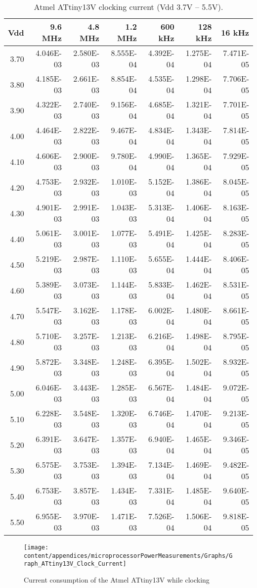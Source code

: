 \begin{sidewaystable}
\begin{centering}
\begin{tabular}{|r|r|r|r|r|r|r|}
\hline
Vdd  & 9.6 MHz  & 4.8 MHz  & 1.2 MHz  & 600 kHz  & 128 kHz  & 16 kHz\tabularnewline
\hline
3.70  & 4.046E-03  & 2.580E-03  & 8.555E-04  & 4.392E-04  & 1.275E-04  & 7.471E-05 \tabularnewline
3.80  & 4.185E-03  & 2.661E-03  & 8.854E-04  & 4.535E-04  & 1.298E-04  & 7.706E-05 \tabularnewline
3.90  & 4.322E-03  & 2.740E-03  & 9.156E-04  & 4.685E-04  & 1.321E-04  & 7.701E-05 \tabularnewline
4.00  & 4.464E-03  & 2.822E-03  & 9.467E-04  & 4.834E-04  & 1.343E-04  & 7.814E-05 \tabularnewline
4.10  & 4.606E-03  & 2.900E-03  & 9.780E-04  & 4.990E-04  & 1.365E-04  & 7.929E-05 \tabularnewline
4.20  & 4.753E-03  & 2.932E-03  & 1.010E-03  & 5.152E-04  & 1.386E-04  & 8.045E-05 \tabularnewline
4.30  & 4.901E-03  & 2.991E-03  & 1.043E-03  & 5.313E-04  & 1.406E-04  & 8.163E-05 \tabularnewline
4.40  & 5.061E-03  & 3.001E-03  & 1.077E-03  & 5.491E-04  & 1.425E-04  & 8.283E-05 \tabularnewline
4.50  & 5.219E-03  & 2.987E-03  & 1.110E-03  & 5.655E-04  & 1.444E-04  & 8.406E-05 \tabularnewline
4.60  & 5.389E-03  & 3.073E-03  & 1.144E-03  & 5.833E-04  & 1.462E-04  & 8.531E-05 \tabularnewline
4.70  & 5.547E-03  & 3.162E-03  & 1.178E-03  & 6.002E-04  & 1.480E-04  & 8.661E-05 \tabularnewline
4.80  & 5.710E-03  & 3.257E-03  & 1.213E-03  & 6.216E-04  & 1.498E-04  & 8.795E-05 \tabularnewline
4.90  & 5.872E-03  & 3.348E-03  & 1.248E-03  & 6.395E-04  & 1.502E-04  & 8.932E-05 \tabularnewline
5.00  & 6.046E-03  & 3.443E-03  & 1.285E-03  & 6.567E-04  & 1.484E-04  & 9.072E-05 \tabularnewline
5.10  & 6.228E-03  & 3.548E-03  & 1.320E-03  & 6.746E-04  & 1.470E-04  & 9.213E-05 \tabularnewline
5.20  & 6.391E-03  & 3.647E-03  & 1.357E-03  & 6.940E-04  & 1.465E-04  & 9.346E-05 \tabularnewline
5.30  & 6.575E-03  & 3.753E-03  & 1.394E-03  & 7.134E-04  & 1.469E-04  & 9.482E-05 \tabularnewline
5.40  & 6.753E-03  & 3.857E-03  & 1.434E-03  & 7.331E-04  & 1.485E-04  & 9.640E-05 \tabularnewline
5.50  & 6.955E-03  & 3.970E-03  & 1.471E-03  & 7.526E-04  & 1.506E-04  & 9.818E-05 \tabularnewline
\hline
\end{tabular}
\par\end{centering}

\protect\caption{Atmel ATtiny13V clocking current (Vdd 3.7V -- 5.5V).}


\end{sidewaystable}
\begin{figure}
\begin{centering}
\texttt{[image: content/appendices/microprocessorPowerMeasurements/Graphs/Graph\_ATtiny13V\_Clock\_Current]}
\par\end{centering}

\protect\caption{
\label{fig:ATtiny13VClkCurrent}Current consumption of the Atmel ATtiny13V
while clocking
}


\end{figure}

